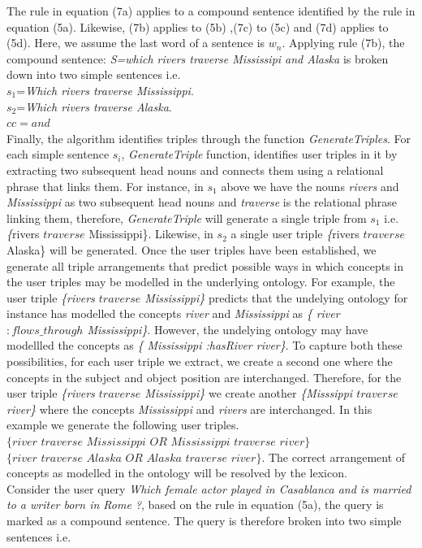 \documentclass[review]{elsarticle}
\begin{document}
The rule in equation (7a) applies to a compound sentence identified by the rule in equation (5a). Likewise, (7b) applies to (5b) ,(7c) to (5c) and (7d) applies to (5d).
 Here, we assume the last word of a sentence is $w_n$. Applying rule (7b),
the  compound sentence: \textit{S=which rivers traverse Mississipi and Alaska} is broken down into two simple sentences i.e.\\
$s_1$=\textit{Which rivers traverse Mississippi}.\\
$s_2$=\textit{Which rivers traverse Alaska}.\\
$cc=and$\\
Finally, the algorithm identifies triples through the function \textit{GenerateTriples}. For each simple sentence $s_i$,  \textit{GenerateTriple} function, identifies  user  triples in it by extracting  two subsequent head nouns and connects them using a relational phrase that links them. For instance, in $s_1$ above  we have the nouns \textit{rivers} and \textit{Mississippi} as  two subsequent head nouns and \textit{traverse} is the relational phrase linking them, therefore, \textit{GenerateTriple}  will generate  a single triple from  $s_1$ i.e. \textit\{rivers $traverse$ Mississippi\}. Likewise,  in $s_2$   a single user triple \textit\{rivers $traverse$ Alaska\}  will be generated. 
Once the user triples have been established, we generate all  triple arrangements that predict possible ways in which concepts in the user triples may be  modelled in the underlying ontology. For example,  the user  triple \textit{\{rivers $traverse$ Mississippi\}} predicts that the undelying ontology for instance has  modelled the concepts \textit{river} and \textit{Mississippi} as \textit{\{ river $:flows\_through$ Mississippi\}}. However, the undelying ontology may have modellled the concepts as \textit{\{ Mississippi :hasRiver river\}}. To capture both these possibilities, for each user triple we extract, we create a second one where the concepts in the subject and object position are  interchanged. Therefore, for the user triple  \textit{\{rivers $traverse$ Mississippi\}} we create another  \textit{\{Misssippi $traverse$ river\}} where the concepts \textit{Mississippi} and \textit{rivers} are interchanged. In this example we generate the following user triples.
$\textit{\{river traverse Mississippi OR  Mississippi traverse  river\}}$
$\textit{\{river traverse Alaska OR  Alaska traverse  river\}}$.
The correct arrangement of concepts as modelled in the ontology will be resolved by the lexicon.\\
Consider  the user query \textit{Which female actor played in Casablanca and is married to a writer born in Rome ?}, based on the rule in equation (5a), the query is marked as a compound sentence. The query is therefore   broken into two simple sentences i.e.\\
\end{document}
